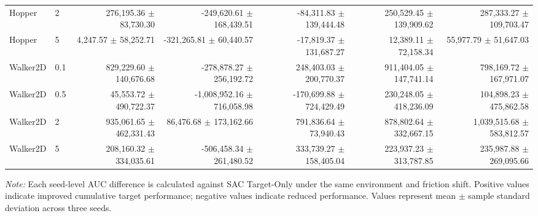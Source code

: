 \begin{table}[htbp]
\begin{adjustbox}{max width=\textwidth}
\begin{tabular}{llrrrrr}
Hopper & 2 & 276,195.36 $\pm$ 83,730.30 & -249,620.61 $\pm$ 168,439.51 & -84,311.83 $\pm$ 139,444.48 & 250,529.45 $\pm$ 139,909.62 & 287,333.27 $\pm$ 109,703.47 \\
Hopper & 5 & 4,247.57 $\pm$ 58,252.71 & -321,265.81 $\pm$ 60,440.57 & -17,819.37 $\pm$ 131,687.27 & 12,389.11 $\pm$ 72,158.34 & 55,977.79 $\pm$ 51,647.03 \\
\midrule
Walker2D & 0.1 & 829,229.60 $\pm$ 140,676.68 & -278,878.27 $\pm$ 256,192.72 & 248,403.03 $\pm$ 200,770.37 & 911,404.05 $\pm$ 147,741.14 & 798,169.72 $\pm$ 167,971.07 \\
Walker2D & 0.5 & 45,553.72 $\pm$ 490,722.37 & -1,008,952.16 $\pm$ 716,058.98 & -170,699.88 $\pm$ 724,429.49 & 230,248.05 $\pm$ 418,236.09 & 104,898.23 $\pm$ 475,862.58 \\
Walker2D & 2 & 935,061.65 $\pm$ 462,331.43 & 86,476.68 $\pm$ 173,162.66 & 791,836.64 $\pm$ 73,940.43 & 878,802.64 $\pm$ 332,667.15 & 1,039,515.68 $\pm$ 583,812.57 \\
Walker2D & 5 & 208,160.32 $\pm$ 334,035.61 & -506,458.34 $\pm$ 261,480.52 & 333,739.27 $\pm$ 158,405.04 & 223,937.23 $\pm$ 313,787.85 & 235,987.88 $\pm$ 269,095.66 \\
\bottomrule
\end{tabular}
\end{adjustbox}
\begin{flushleft}
\footnotesize \textit{Note:} Each seed-level AUC difference is calculated against SAC Target-Only under the same environment and friction shift. Positive values indicate improved cumulative target performance; negative values indicate reduced performance. Values represent mean $\pm$ sample standard deviation across three seeds.
\end{flushleft}
\end{table}